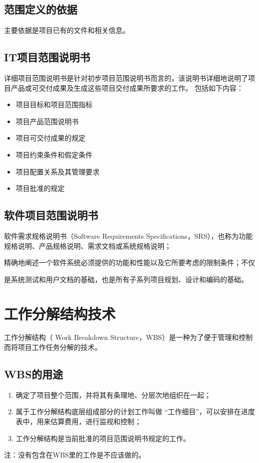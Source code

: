 \subsection{范围定义的依据}
主要依据是项目已有的文件和相关信息。
\subsection{IT项目范围说明书}
详细项目范围说明书是针对初步项目范围说明书而言的，该说明书详细地说明了项目产品或可交付成果及生成这些项目交付成果所要求的工作。
包括如下内容：
\begin{itemize}
	\item 项目目标和项目范围指标 
	\item 项目产品范围说明书 
	\item 项目可交付成果的规定 
	\item 项目约束条件和假定条件 
	\item 项目配置关系及其管理要求 
	\item 项目批准的规定 
\end{itemize}
\subsection{软件项目范围说明书}
软件需求规格说明书（Software Requirements Specifications，SRS），也称为功能规格说明、产品规格说明、需求文档或系统规格说明；
\par 精确地阐述一个软件系统必须提供的功能和性能以及它所要考虑的限制条件；不仅\par 是系统测试和用户文档的基础，也是所有子系列项目规划、设计和编码的基础。
\section{工作分解结构技术}
工作分解结构（ Work Breakdown Structure，WBS）是一种为了便于管理和控制而将项目工作任务分解的技术。
\subsection{WBS的用途}
\begin{enumerate}
	\item 确定了项目整个范围，并将其有条理地、分层次地组织在一起；
	\item 属于工作分解结构底层组成部分的计划工作叫做 “工作细目”，可以安排在进度表中，用来估算费用，进行监视和控制；
	\item 工作分解结构是当前批准的项目范围说明书规定的工作。
\end{enumerate}
注：没有包含在WBS里的工作是不应该做的。

